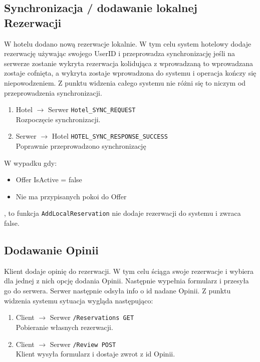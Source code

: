\documentclass{article}
\begin{document}
\subsection{Synchronizacja / dodawanie lokalnej Rezerwacji}
W hotelu dodano nową rezerwacje lokalnie. W tym celu system hotelowy dodaje rezerwację używając swojego UserID i przeprowadza synchronizację jeśli na serwerze zostanie wykryta rezerwacja kolidująca z wprowadzaną to wprowadzana zostaje cofnięta, a wykryta zostaje wprowadzona do systemu i operacja kończy się niepowodzeniem.\newline
Z punktu widzenia całego systemu nie różni się to niczym od przeprowadzenia synchronizacji.\newline
\begin{enumerate}
    \item Hotel $\rightarrow$  Serwer \texttt{Hotel\_SYNC\_REQUEST} \\
    Rozpoczęcie synchronizacji.
    \item Serwer $\rightarrow$ Hotel \texttt{HOTEL\_SYNC\_RESPONSE\_SUCCESS}\\
    Poprawnie przeprowadzono synchronizację
\end{enumerate}
W wypadku gdy:
\begin{itemize}
    \item Offer IsActive = false
    \item Nie ma przypisanych pokoi do Offer
\end{itemize}
, to funkcja \texttt{AddLocalReservation} nie dodaje rezerwacji do systemu i zwraca false.

\subsection{Dodawanie Opinii}
Klient dodaje opinię do rezerwacji. W tym celu ściąga swoje rezerwacje i wybiera dla jednej z nich opcję dodania Opinii. Następnie wypełnia formularz i przesyła go do serwera. Serwer następnie odsyła info o id nadane Opinii.\newline
Z punktu widzenia systemu sytuacja wygląda następująco:
\begin{enumerate}
    \item Client $\rightarrow$  Serwer \texttt{/Reservations GET} \\
    Pobieranie własnych rezerwacji.
    \item Client $\rightarrow$ Serwer \texttt{/Review POST}\\
    Klient wysyła formularz i dostaje zwrot z id Opinii.
\end{enumerate}
\end{document}
